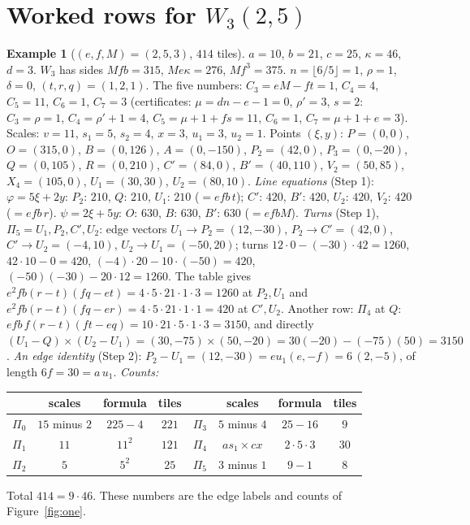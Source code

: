 \documentclass[11pt,reqno]{amsart}
\theoremstyle{plain}
\theoremstyle{definition}
\newtheorem{example}[theorem]{Example}
\begin{document}
\section{Worked rows for $W_3(2,5)$}\label{sec:worked}
\begin{example}[$(e,f,M)=(2,5,3)$, $414$ tiles]\label{ex:414}
$a=10$, $b=21$, $c=25$, $\kappa=46$, $d=3$. $W_3$ has sides $Mfb=315$, $Me\kappa=276$, $Mf^3=375$. $n=\lfloor6/5\rfloor=1$, $\rho=1$, $\delta=0$, $(t,r,q)=(1,2,1)$. The five numbers: $C_3=eM-ft=1$, $C_4=4$, $C_5=11$, $C_6=1$, $C_7=3$ (certificates: $\mu=dn-e-1=0$, $\rho'=3$, $s=2$: $C_3=\rho=1$, $C_4=\rho'+1=4$, $C_5=\mu+1+fs=11$, $C_6=1$, $C_7=\mu+1+e=3$). Scales: $v=11$, $s_1=5$, $s_2=4$, $x=3$, $u_1=3$, $u_2=1$.
Points $(\xi,y)$: $P=(0,0)$, $O=(315,0)$, $B=(0,126)$, $A=(0,-150)$, $P_2=(42,0)$, $P_3=(0,-20)$, $Q=(0,105)$, $R=(0,210)$, $C'=(84,0)$, $B'=(40,110)$, $V_2=(50,85)$, $X_4=(105,0)$, $U_1=(30,30)$, $U_2=(80,10)$.
\emph{Line equations} (Step 1): $\varphi=5\xi+2y$: $P_2$: $210$, $Q$: $210$, $U_1$: $210$ ($=efb\,t$); $C'$: $420$, $B'$: $420$, $U_2$: $420$, $V_2$: $420$ ($=efb\,r$). $\psi=2\xi+5y$: $O$: $630$, $B$: $630$, $B'$: $630$ ($=efbM$).
\emph{Turns} (Step 1), $\Pi_5=U_1,P_2,C',U_2$: edge vectors $U_1\to P_2=(12,-30)$, $P_2\to C'=(42,0)$, $C'\to U_2=(-4,10)$, $U_2\to U_1=(-50,20)$; turns $12\cdot0-(-30)\cdot42=1260$, $42\cdot10-0=420$, $(-4)\cdot20-10\cdot(-50)=420$, $(-50)(-30)-20\cdot12=1260$. The table gives $e^2fb(r-t)(fq-et)=4\cdot5\cdot21\cdot1\cdot3=1260$ at $P_2,U_1$ and $e^2fb(r-t)(fq-er)=4\cdot5\cdot21\cdot1\cdot1=420$ at $C',U_2$. Another row: $\Pi_4$ at $Q$: $efb\,f(r-t)(ft-eq)=10\cdot21\cdot5\cdot1\cdot3=3150$, and directly $(U_1-Q)\times(U_2-U_1)=(30,-75)\times(50,-20)=30(-20)-(-75)(50)=3150$.
\emph{An edge identity} (Step 2): $P_2-U_1=(12,-30)=e u_1(e,-f)=6\,(2,-5)$, of length $6f=30=a\,u_1$.
\emph{Counts:}
\begin{center}\small
\begin{tabular}{@{}lccc@{\qquad}lccc@{}}
\toprule
 & scales & formula & tiles & & scales & formula & tiles\\
\midrule
$\Pi_0$ & $15$ minus $2$ & $225-4$ & $221$ & $\Pi_3$ & $5$ minus $4$ & $25-16$ & $9$\\
$\Pi_1$ & $11$ & $11^2$ & $121$ & $\Pi_4$ & $as_1\times cx$ & $2\cdot5\cdot3$ & $30$\\
$\Pi_2$ & $5$ & $5^2$ & $25$ & $\Pi_5$ & $3$ minus $1$ & $9-1$ & $8$\\
\bottomrule
\end{tabular}
\end{center}
Total $414=9\cdot46$. These numbers are the edge labels and counts of Figure~\ref{fig:one}.
\end{example}
\end{document}

